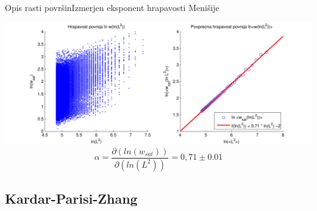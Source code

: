 \documentclass{beamer}
\begin{document}
\begin{frame}{Opis rasti površin}{Izmerjen eksponent hrapavosti Menišije}
\begin{center}
  \footnotesize
  \hspace*{-0.04\textwidth}\includegraphics[width=1.1\textwidth]{slike/menisija-alfa-3d}
  \begin{equation} \alpha = \frac{\partial ( ln (w_{sat}) ) }{\partial ( ln (L^2) )} =  0,71 \pm 0.01 \end{equation}
\end{center}
\end{frame}

\subsection{Kardar-Parisi-Zhang}
\end{document}
